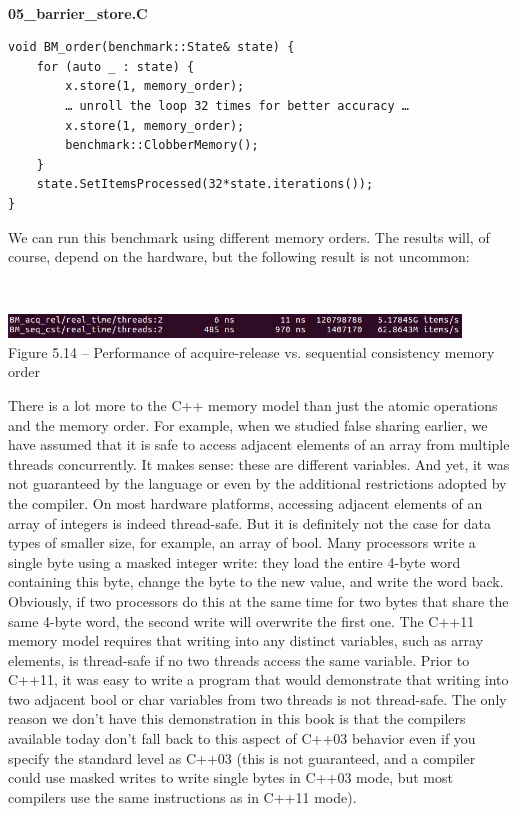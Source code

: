 \hspace*{\fill} \\ %
\noindent
\textbf{05\_barrier\_store.C}
\begin{lstlisting}[style=styleCXX]
void BM_order(benchmark::State& state) {
	for (auto _ : state) {
		x.store(1, memory_order);
		… unroll the loop 32 times for better accuracy …
		x.store(1, memory_order);
		benchmark::ClobberMemory();
	}
	state.SetItemsProcessed(32*state.iterations());
}
\end{lstlisting}

We can run this benchmark using different memory orders. The results will, of course, depend on the hardware, but the following result is not uncommon:

\hspace*{\fill} \\ %
\begin{center}
\includegraphics[width=0.9\textwidth]{content/1/chapter5/images/14.jpg}\\
Figure 5.14 – Performance of acquire-release vs. sequential consistency memory order
\end{center}

There is a lot more to the C++ memory model than just the atomic operations and the memory order. For example, when we studied false sharing earlier, we have assumed that it is safe to access adjacent elements of an array from multiple threads concurrently. It makes sense: these are different variables. And yet, it was not guaranteed by the language or even by the additional restrictions adopted by the compiler. On most hardware platforms, accessing adjacent elements of an array of integers is indeed thread-safe. But it is definitely not the case for data types of smaller size, for example, an array of bool. Many processors write a single byte using a masked integer write: they load the entire 4-byte word containing this byte, change the byte to the new value, and write the word back. Obviously, if two processors do this at the same time for two bytes that share the same 4-byte word, the second write will overwrite the first one. The C++11 memory model requires that writing into any distinct variables, such as array elements, is thread-safe if no two threads access the same variable. Prior to C++11, it was easy to write a program that would demonstrate that writing into two adjacent bool or char variables from two threads is not thread-safe. The only reason we don't have this demonstration in this book is that the compilers available today don't fall back to this aspect of C++03 behavior even if you specify the standard level as C++03 (this is not guaranteed, and a compiler could use masked writes to write single bytes in C++03 mode, but most compilers use the same instructions as in C++11 mode).

